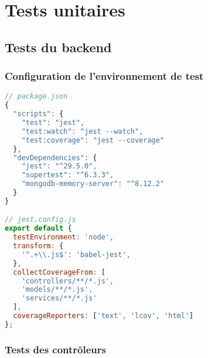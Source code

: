 \section{Tests unitaires}

\subsection{Tests du backend}

\subsubsection{Configuration de l'environnement de test}

\begin{lstlisting}[language=JavaScript, caption=Configuration Jest]
// package.json
{
  "scripts": {
    "test": "jest",
    "test:watch": "jest --watch",
    "test:coverage": "jest --coverage"
  },
  "devDependencies": {
    "jest": "^29.5.0",
    "supertest": "^6.3.3",
    "mongodb-memory-server": "^8.12.2"
  }
}

// jest.config.js
export default {
  testEnvironment: 'node',
  transform: {
    '^.+\\.js$': 'babel-jest',
  },
  collectCoverageFrom: [
    'controllers/**/*.js',
    'models/**/*.js',
    'services/**/*.js'
  ],
  coverageReporters: ['text', 'lcov', 'html']
};
\end{lstlisting}

\subsubsection{Tests des contrôleurs}

